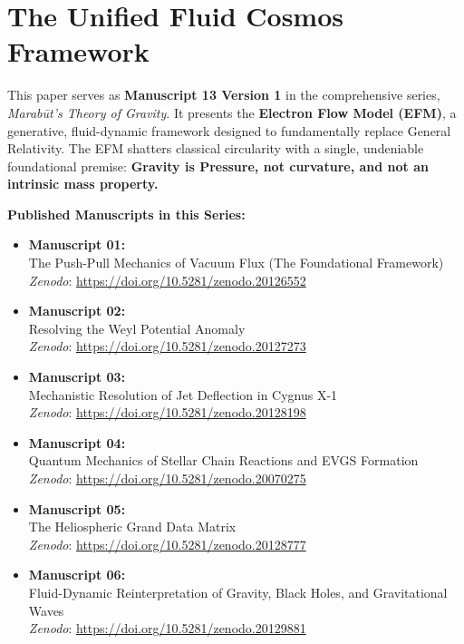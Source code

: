 \documentclass[11pt, a4paper, table]{article}
\begin{document}
\section*{The Unified Fluid Cosmos Framework}
  This paper serves as \textbf{Manuscript 13 Version 1} in the comprehensive series, \textit{Marab\={u}t's Theory of Gravity}. It presents the \textbf{Electron Flow Model (EFM)}, a generative, fluid-dynamic framework designed to fundamentally replace General Relativity. The EFM shatters classical circularity with a single, undeniable foundational premise: \textbf{Gravity is Pressure, not curvature, and not an intrinsic mass property.}

  \vspace{1em}
  \noindent \textbf{Published Manuscripts in this Series:}
  \begin{itemize}
    \item \textbf{Manuscript 01:} \\ The Push-Pull Mechanics of Vacuum Flux (The Foundational Framework) \\ \textit{Zenodo}: \url{https://doi.org/10.5281/zenodo.20126552}
    
    \item \textbf{Manuscript 02:} \\ Resolving the Weyl Potential Anomaly \\ \textit{Zenodo}: \url{https://doi.org/10.5281/zenodo.20127273}

    \item \textbf{Manuscript 03:} \\ Mechanistic Resolution of Jet Deflection in Cygnus X-1 \\ \textit{Zenodo}: \url{https://doi.org/10.5281/zenodo.20128198}

    \item \textbf{Manuscript 04:} \\ Quantum Mechanics of Stellar Chain Reactions and EVGS Formation \\ \textit{Zenodo}: \url{https://doi.org/10.5281/zenodo.20070275}

    \item \textbf{Manuscript 05:} \\ The Heliospheric Grand Data Matrix \\ \textit{Zenodo}: \url{https://doi.org/10.5281/zenodo.20128777}

    \item \textbf{Manuscript 06:} \\ Fluid-Dynamic Reinterpretation of Gravity, Black Holes, and Gravitational Waves \\ \textit{Zenodo}: \url{https://doi.org/10.5281/zenodo.20129881}


\end{itemize}
\end{document}
